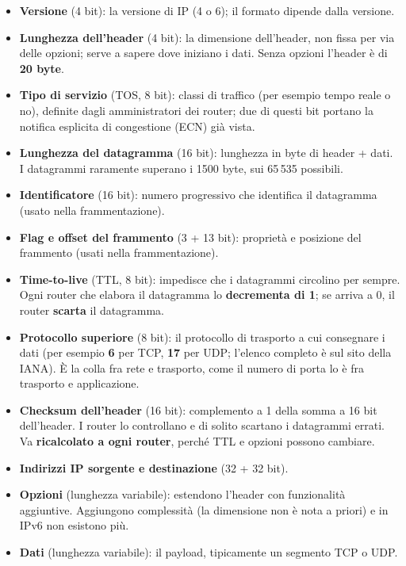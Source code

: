 \begin{itemize}
    \item \textbf{Versione} (4 bit): la versione di IP (4 o 6); il formato dipende dalla versione.
    \item \textbf{Lunghezza dell'header} (4 bit): la dimensione dell'header, non fissa per via delle opzioni; serve a sapere
          dove iniziano i dati. Senza opzioni l'header è di \textbf{20 byte}.
    \item \textbf{Tipo di servizio} (TOS, 8 bit): classi di traffico (per esempio tempo reale o no), definite dagli
          amministratori dei router; due di questi bit portano la notifica esplicita di congestione (ECN) già vista.
    \item \textbf{Lunghezza del datagramma} (16 bit): lunghezza in byte di header + dati. I datagrammi raramente superano
          i 1500 byte, sui 65\,535 possibili.
    \item \textbf{Identificatore} (16 bit): numero progressivo che identifica il datagramma (usato nella frammentazione).
    \item \textbf{Flag e offset del frammento} (3 + 13 bit): proprietà e posizione del frammento (usati nella frammentazione).
    \item \textbf{Time-to-live} (TTL, 8 bit): impedisce che i datagrammi circolino per sempre. Ogni router che elabora il
          datagramma lo \textbf{decrementa di 1}; se arriva a 0, il router \textbf{scarta} il datagramma.
    \item \textbf{Protocollo superiore} (8 bit): il protocollo di trasporto a cui consegnare i dati (per esempio \textbf{6} per
          TCP, \textbf{17} per UDP; l'elenco completo è sul sito della IANA). È la colla fra rete e trasporto, come il numero
          di porta lo è fra trasporto e applicazione.
    \item \textbf{Checksum dell'header} (16 bit): complemento a 1 della somma a 16 bit dell'header. I router lo controllano e di
          solito scartano i datagrammi errati. Va \textbf{ricalcolato a ogni router}, perché TTL e opzioni possono cambiare.
    \item \textbf{Indirizzi IP sorgente e destinazione} (32 + 32 bit).
    \item \textbf{Opzioni} (lunghezza variabile): estendono l'header con funzionalità aggiuntive. Aggiungono complessità (la
          dimensione non è nota a priori) e in IPv6 non esistono più.
    \item \textbf{Dati} (lunghezza variabile): il payload, tipicamente un segmento TCP o UDP.
\end{itemize}

